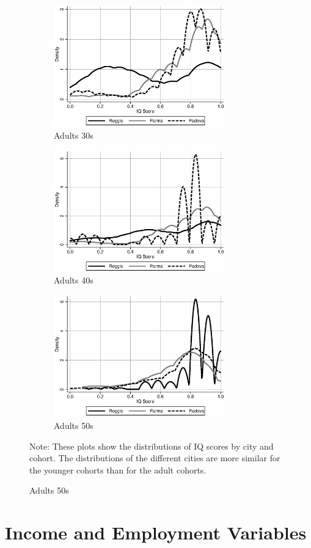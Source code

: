 \begin{figure}[H]
\begin{center}
\begin{subfigure}{.5\textwidth}
		\centering
		\includegraphics[width=20em]{../../../../Output/IQ_hist_4}
		\caption{Adults 30s}
	\end{subfigure}
	\begin{subfigure}{.5\textwidth}
		\centering
		\includegraphics[width=20em]{../../../../Output/IQ_hist_5}
		\caption{Adults 40s}
	\end{subfigure}%
	\begin{subfigure}{.5\textwidth}
		\centering
		\includegraphics[width=20em]{../../../../Output/IQ_hist_6}
		\caption{Adults 50s}
	\end{subfigure}
\end{center}
\raggedright \footnotesize
Note: These plots show the distributions of IQ scores by city and cohort. The distributions of the different cities are more similar for the younger cohorts than for the adult cohorts. 
\end{figure}


\section{Income and Employment Variables}
\label{sec:income}
